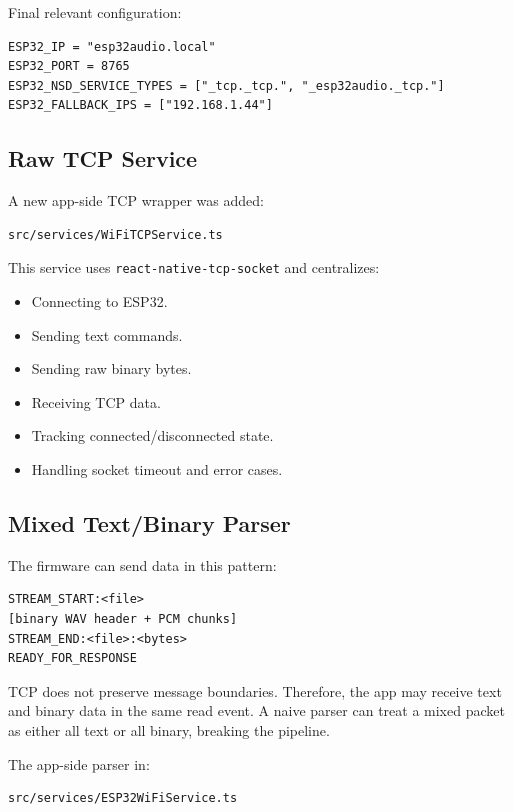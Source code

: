 \documentclass[11pt,a4paper]{article}
\begin{document}
Final relevant configuration:

\begin{lstlisting}[style=logstyle]
ESP32_IP = "esp32audio.local"
ESP32_PORT = 8765
ESP32_NSD_SERVICE_TYPES = ["_tcp._tcp.", "_esp32audio._tcp."]
ESP32_FALLBACK_IPS = ["192.168.1.44"]
\end{lstlisting}

\subsection{Raw TCP Service}

A new app-side TCP wrapper was added:

\begin{lstlisting}[style=logstyle]
src/services/WiFiTCPService.ts
\end{lstlisting}

This service uses \texttt{react-native-tcp-socket} and centralizes:

\begin{itemize}[leftmargin=*]
  \item Connecting to ESP32.
  \item Sending text commands.
  \item Sending raw binary bytes.
  \item Receiving TCP data.
  \item Tracking connected/disconnected state.
  \item Handling socket timeout and error cases.
\end{itemize}

\subsection{Mixed Text/Binary Parser}

The firmware can send data in this pattern:

\begin{lstlisting}[style=logstyle]
STREAM_START:<file>
[binary WAV header + PCM chunks]
STREAM_END:<file>:<bytes>
READY_FOR_RESPONSE
\end{lstlisting}

TCP does not preserve message boundaries. Therefore, the app may receive text and binary data in the same read event. A naive parser can treat a mixed packet as either all text or all binary, breaking the pipeline.

The app-side parser in:

\begin{lstlisting}[style=logstyle]
src/services/ESP32WiFiService.ts
\end{lstlisting}
\end{document}
